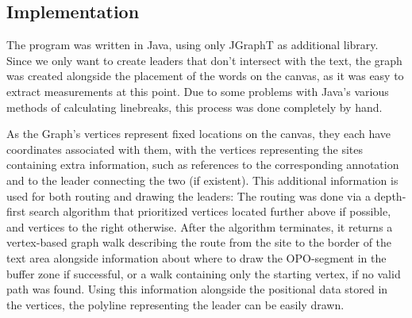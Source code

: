 \documentclass[11pt,a4paper]{vutinfth}
\begin{document}
\subsection{Implementation}
The program was written in Java, using only JGraphT\cite{JGraphT} as additional library. Since we only want to create leaders that don't intersect with the text, the graph was created alongside the placement of the words on the canvas, as it was easy to extract measurements at this point. Due to some problems with Java's various methods of calculating linebreaks, this process was done completely by hand.

As the Graph's vertices represent fixed locations on the canvas, they each have coordinates associated with them, with the vertices representing the sites containing extra information, such as references to the corresponding annotation and to the leader connecting the two (if existent). This additional information is used for both routing and drawing the leaders: The routing was done via a depth-first search algorithm that prioritized vertices located further above if possible, and vertices to the right otherwise. After the algorithm terminates, it returns  a vertex-based graph walk describing the route from the site to the border of the text area alongside information about where to draw the OPO-segment in the buffer zone if successful, or a walk containing only the starting vertex, if no valid path was found. Using this information alongside the positional data stored in the vertices, the polyline representing the leader can be easily drawn.









\backmatter %



\end{document}
